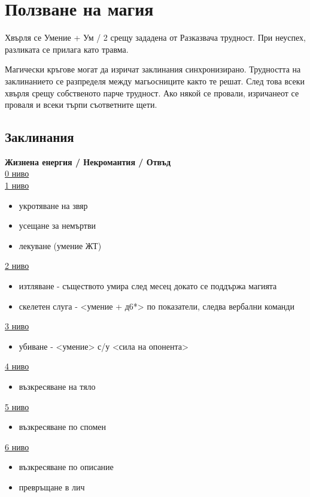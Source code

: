 \section{Ползване на магия}
Хвърля се Умение + Ум / 2 срещу зададена от Разказвача трудност. При
неуспех, разликата се прилага като травма.

Магически кръгове могат да изричат заклинания синхронизирано. Трудността
на заклинанието се разпределя между магьосниците както те решат. След това
всеки хвърля срещу собственото парче трудност. Ако някой се провали,
изричанеот се проваля и всеки търпи съответните щети.


\subsection{Заклинания} 

\textbf{Жизнена енергия / Некромантия / Отвъд}  \\ 
\underline{0 ниво} \\
\underline{1 ниво} \\
\begin{itemize}
  \item{укротяване на звяр}
  \item{усещане за немъртви}
  \item{лекуване (умение ЖТ)}
\end{itemize}

\underline{2 ниво}
\begin{itemize}
  \item{изтляване - съществото умира след месец  докато се поддържа магията}
  \item{скелетен слуга - <умение + д6*> по показатели, следва вербални команди}
\end{itemize}

\underline{3 ниво}
\begin{itemize}
\item{убиване - <умение> с/у <сила на опонента>}
\end{itemize}

\underline{4 ниво}
\begin{itemize}
\item{възкресяване на тяло}
\end{itemize}

\underline{5 ниво}
\begin{itemize}
\item{възкресяване по спомен}
\end{itemize}

\underline{6 ниво}
\begin{itemize}
\item{възкресяване по описание}
\item{превръщане в лич}
\end{itemize}

